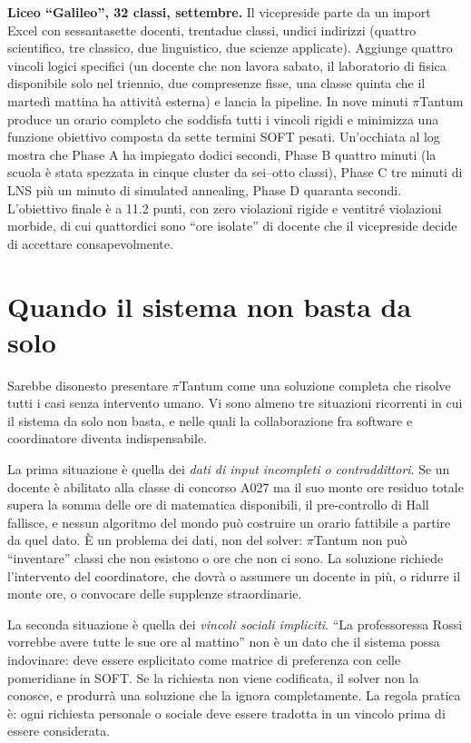 \begin{casostudiobox}
\textbf{Liceo ``Galileo'', 32 classi, settembre.} Il
vicepreside parte da un import Excel con sessantasette
docenti, trentadue classi, undici indirizzi (quattro
scientifico, tre classico, due linguistico, due scienze
applicate). Aggiunge quattro vincoli logici specifici (un
docente che non lavora sabato, il laboratorio di fisica
disponibile solo nel triennio, due compresenze fisse, una
classe quinta che il marted\`i mattina ha attivit\`a esterna)
e lancia la pipeline. In nove minuti $\pi$Tantum produce un
orario completo che soddisfa tutti i vincoli rigidi e
minimizza una funzione obiettivo composta da sette termini
SOFT pesati. Un'occhiata al log mostra che Phase A ha
impiegato dodici secondi, Phase B quattro minuti (la scuola
\`e stata spezzata in cinque cluster da sei--otto classi),
Phase C tre minuti di LNS pi\`u un minuto di simulated
annealing, Phase D quaranta secondi. L'obiettivo finale \`e
a 11.2 punti, con zero violazioni rigide e ventitr\'e
violazioni morbide, di cui quattordici sono ``ore isolate'' di
docente che il vicepreside decide di accettare consapevolmente.
\end{casostudiobox}

\section{Quando il sistema non basta da solo}

Sarebbe disonesto presentare $\pi$Tantum come una soluzione
completa che risolve tutti i casi senza intervento umano. Vi
sono almeno tre situazioni ricorrenti in cui il sistema da
solo non basta, e nelle quali la collaborazione fra software
e coordinatore diventa indispensabile.

La prima situazione \`e quella dei \emph{dati di input
incompleti o contraddittori}. Se un docente \`e abilitato
alla classe di concorso A027 ma il suo monte ore residuo
totale supera la somma delle ore di matematica disponibili,
il pre-controllo di Hall fallisce, e nessun algoritmo del
mondo pu\`o costruire un orario fattibile a partire da quel
dato. \`E un problema dei dati, non del solver: $\pi$Tantum
non pu\`o ``inventare'' classi che non esistono o ore che non
ci sono. La soluzione richiede l'intervento del coordinatore,
che dovr\`a o assumere un docente in pi\`u, o ridurre il monte
ore, o convocare delle supplenze straordinarie.

La seconda situazione \`e quella dei \emph{vincoli sociali
impliciti}. ``La professoressa Rossi vorrebbe avere tutte le
sue ore al mattino'' non \`e un dato che il sistema possa
indovinare: deve essere esplicitato come matrice di
preferenza con celle pomeridiane in SOFT. Se la richiesta non
viene codificata, il solver non la conosce, e produrr\`a una
soluzione che la ignora completamente. La regola pratica \`e:
ogni richiesta personale o sociale deve essere tradotta in un
vincolo prima di essere considerata.

